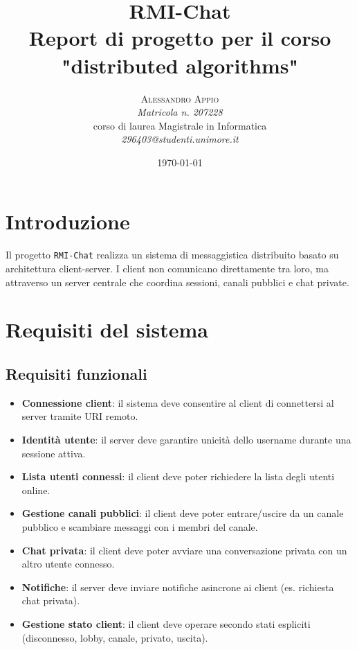 \documentclass[11pt,a4paper]{article}
\begin{document}
\title{RMI-Chat\\
    \Large{Report di progetto per il corso "distributed algorithms"}
} %

\author{\textsc{Alessandro Appio} \\
    \emph{Matricola n. 207228} \\
    corso di laurea Magistrale in Informatica\\
    \emph{296403@studenti.unimore.it}
  }

\date{\today}

\maketitle %
\newpage
\tableofcontents
\newpage
\maketitle

\section{Introduzione}
Il progetto \texttt{RMI-Chat} realizza un sistema di messaggistica distribuito basato su architettura client-server. I client non comunicano direttamente tra loro, ma attraverso un server centrale che coordina sessioni, canali pubblici e chat private.

\section{Requisiti del sistema}
\subsection{Requisiti funzionali}
\begin{itemize}
  \item \textbf{Connessione client}: il sistema deve consentire al client di connettersi al server tramite URI remoto.
  \item \textbf{Identità utente}: il server deve garantire unicità dello username durante una sessione attiva.
  \item \textbf{Lista utenti connessi}: il client deve poter richiedere la lista degli utenti online.
  \item \textbf{Gestione canali pubblici}: il client deve poter entrare/uscire da un canale pubblico e scambiare messaggi con i membri del canale.
  \item \textbf{Chat privata}: il client deve poter avviare una conversazione privata con un altro utente connesso.
  \item \textbf{Notifiche}: il server deve inviare notifiche asincrone ai client (es. richiesta chat privata).
  \item \textbf{Gestione stato client}: il client deve operare secondo stati espliciti (disconnesso, lobby, canale, privato, uscita).
\end{itemize}
\end{document}
